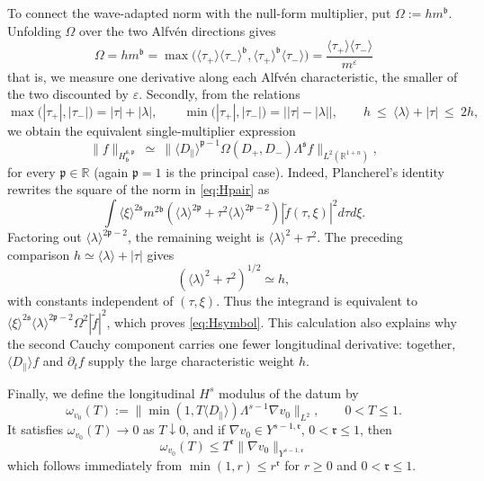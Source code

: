 \documentclass[11pt,reqno]{amsart}
\theoremstyle{plain}
\theoremstyle{definition}
\theoremstyle{remark}
\numberwithin{equation}{section}
\newcommand{\breg}{\mathfrak b}
\newcommand{\sreg}{\mathfrak s}
\newcommand{\preg}{\mathfrak p}
\newcommand{\rpar}{\mathfrak r}
\newcommand{\Real}{\mathbb R}
\begin{document}
To connect the wave-adapted norm with the null-form multiplier, put
$\Omega:=hm^{\breg}$. Unfolding $\Omega$ over the two Alfv\'en directions gives
\begin{equation}\label{eq:pmax}
\Omega
 =h m^{\breg}
 =\max\big(\langle\tau_+\rangle\langle\tau_-\rangle^{\breg},
             \langle\tau_+\rangle^{\breg}\langle\tau_-\rangle\big)
 =\frac{\langle\tau_+\rangle\langle\tau_-\rangle}{m^{\varepsilon}}
\end{equation}
that is, we measure one derivative along each Alfv\'en
characteristic, the smaller of the two discounted by $\varepsilon$. Secondly, from the relations
\[
\max\big(|\tau_+|,|\tau_-|\big)=|\tau|+|\lambda| ,\qquad
\min\big(|\tau_+|,|\tau_-|\big)=\big| |\tau|-|\lambda| \big| ,\qquad
h\ \le\ \langle\lambda\rangle+|\tau|\ \le\ 2h ,
\]
we obtain the equivalent single-multiplier expression
\begin{equation}\label{eq:Hsymbol}
\|f\|_{H^{\sreg,\preg}_{\breg}}\ \simeq\
\big\|\langle D_{\parallel}\rangle^{\preg-1}\Omega(D_+,D_-)\Lambda^{\sreg}f\big\|_{L^2(\mathbb{R}^{1+n})},
\end{equation}
for every $\preg\in\Real$ (again $\preg=1$ is the principal case).  Indeed, Plancherel's identity rewrites the
square of the norm in \eqref{eq:Hpair} as
\[
 \int \langle\xi\rangle^{2\sreg}m^{2\breg}
 \left(\langle\lambda\rangle^{2\preg}
       +\tau^2\langle\lambda\rangle^{2\preg-2}\right)
 |\widetilde f(\tau,\xi)|^2 d\tau d\xi .
\]
Factoring out $\langle\lambda\rangle^{2\preg-2}$, the remaining
weight is $\langle\lambda\rangle^2+\tau^2$.  The preceding comparison
$h\simeq\langle\lambda\rangle+|\tau|$ gives
\[
 (\langle\lambda\rangle^2+\tau^2)^{1/2}\simeq h,
\]
with constants independent of $(\tau,\xi)$.  Thus the integrand is
equivalent to
$\langle\xi\rangle^{2\sreg}\langle\lambda\rangle^{2\preg-2}
\Omega^2|\widetilde f|^2$, which proves \eqref{eq:Hsymbol}.  This
calculation also explains why the second Cauchy component carries one fewer
longitudinal derivative: together, $\langle D_\parallel\rangle f$ and $\partial_t f$ supply the
large characteristic weight $h$.

Finally, we define the longitudinal $H^s$ modulus of the datum by
\begin{equation}\label{eq:datum-modulus}
 \omega_{v_0}(T)
 :=\big\|\min(1,T\langle D_{\parallel}\rangle)
                 \Lambda^{s-1}\nabla v_0\big\|_{L^2},
 \qquad 0<T\le1.
\end{equation}
It satisfies $\omega_{v_0}(T)\to0$ as $T\downarrow0$, and if
$\nabla v_0\in Y^{s-1,\rpar}$, $0<\rpar\le1$, then
\begin{equation}\label{eq:omegav0bound}
    \omega_{v_0}(T)\le T^{\rpar}\|\nabla v_0\|_{Y^{s-1,\rpar}}
\end{equation}
which follows immediately from $\min(1,r)\leq r^\rpar$ for $r\geq 0$ and $0<\rpar\leq 1$.\\
 
\end{document}
